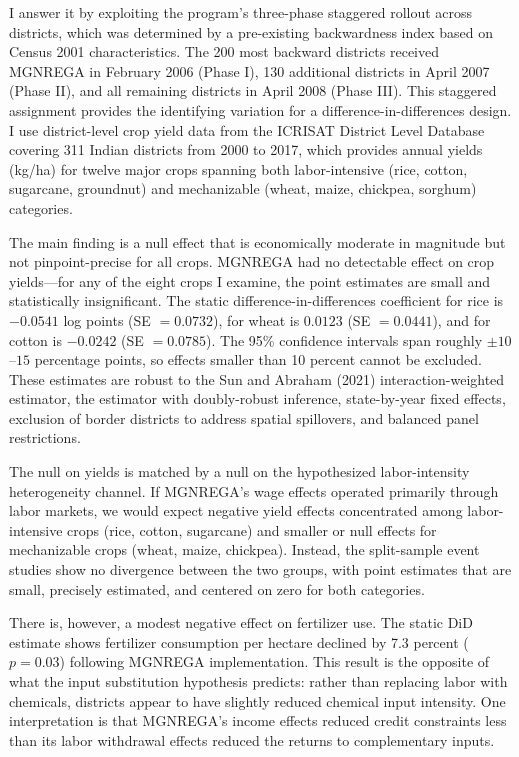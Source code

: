 \documentclass[12pt]{article}
\begin{document}
I answer it by exploiting the program's three-phase staggered rollout across districts, which was determined by a pre-existing backwardness index based on Census 2001 characteristics. The 200 most backward districts received MGNREGA in February 2006 (Phase I), 130 additional districts in April 2007 (Phase II), and all remaining districts in April 2008 (Phase III). This staggered assignment provides the identifying variation for a difference-in-differences design. I use district-level crop yield data from the ICRISAT District Level Database covering 311 Indian districts from 2000 to 2017, which provides annual yields (kg/ha) for twelve major crops spanning both labor-intensive (rice, cotton, sugarcane, groundnut) and mechanizable (wheat, maize, chickpea, sorghum) categories.

The main finding is a null effect that is economically moderate in magnitude but not pinpoint-precise for all crops. MGNREGA had no detectable effect on crop yields---for any of the eight crops I examine, the point estimates are small and statistically insignificant. The static difference-in-differences coefficient for rice is $-0.0541$ log points (SE $= 0.0732$), for wheat is $0.0123$ (SE $= 0.0441$), and for cotton is $-0.0242$ (SE $= 0.0785$). The 95\% confidence intervals span roughly $\pm 10$--$15$ percentage points, so effects smaller than 10 percent cannot be excluded. These estimates are robust to the Sun and Abraham (2021) interaction-weighted estimator, the \citet{callaway2021difference} estimator with doubly-robust inference, state-by-year fixed effects, exclusion of border districts to address spatial spillovers, and balanced panel restrictions.

The null on yields is matched by a null on the hypothesized labor-intensity heterogeneity channel. If MGNREGA's wage effects operated primarily through labor markets, we would expect negative yield effects concentrated among labor-intensive crops (rice, cotton, sugarcane) and smaller or null effects for mechanizable crops (wheat, maize, chickpea). Instead, the split-sample event studies show no divergence between the two groups, with point estimates that are small, precisely estimated, and centered on zero for both categories.

There is, however, a modest negative effect on fertilizer use. The static DiD estimate shows fertilizer consumption per hectare declined by 7.3 percent ($p = 0.03$) following MGNREGA implementation. This result is the opposite of what the input substitution hypothesis predicts: rather than replacing labor with chemicals, districts appear to have slightly reduced chemical input intensity. One interpretation is that MGNREGA's income effects reduced credit constraints less than its labor withdrawal effects reduced the returns to complementary inputs.
\end{document}
